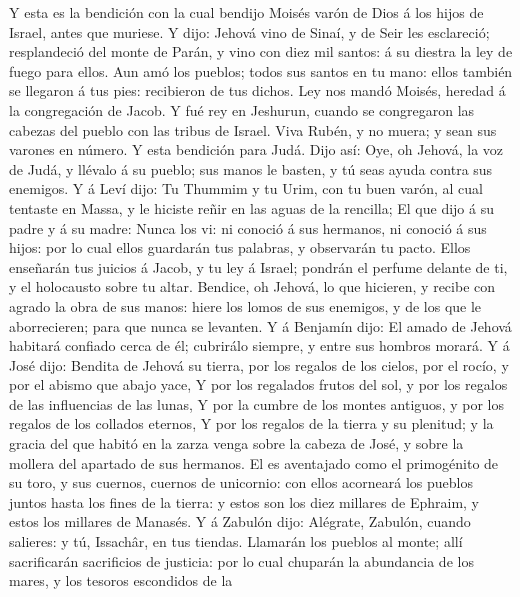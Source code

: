  Y esta es la bendición con la cual bendijo Moisés varón
de Dios á los hijos de Israel, antes que muriese.  Y dijo:
Jehová vino de Sinaí, y de Seir les esclareció; resplandeció del monte
de Parán, y vino con diez mil santos: á su diestra la ley de fuego para
ellos.  Aun amó los pueblos; todos sus santos en tu mano:
ellos también se llegaron á tus pies: recibieron de tus dichos.
 Ley nos mandó Moisés, heredad á la congregación de Jacob.
 Y fué rey en Jeshurun, cuando se congregaron las cabezas
del pueblo con las tribus de Israel.  Viva Rubén, y no
muera; y sean sus varones en número.  Y esta bendición
para Judá. Dijo así: Oye, oh Jehová, la voz de Judá, y llévalo á su
pueblo; sus manos le basten, y tú seas ayuda contra sus enemigos.
 Y á Leví dijo: Tu Thummim y tu Urim, con tu buen varón,
al cual tentaste en Massa, y le hiciste reñir en las aguas de la
rencilla;  El que dijo á su padre y á su madre: Nunca los
vi: ni conoció á sus hermanos, ni conoció á sus hijos: por lo cual ellos
guardarán tus palabras, y observarán tu pacto.  Ellos
enseñarán tus juicios á Jacob, y tu ley á Israel; pondrán el perfume
delante de ti, y el holocausto sobre tu altar.  Bendice,
oh Jehová, lo que hicieren, y recibe con agrado la obra de sus manos:
hiere los lomos de sus enemigos, y de los que le aborrecieren; para que
nunca se levanten.  Y á Benjamín dijo: El amado de Jehová
habitará confiado cerca de él; cubrirálo siempre, y entre sus hombros
morará.  Y á José dijo: Bendita de Jehová su tierra, por
los regalos de los cielos, por el rocío, y por el abismo que abajo yace,
 Y por los regalados frutos del sol, y por los regalos de
las influencias de las lunas,  Y por la cumbre de los
montes antiguos, y por los regalos de los collados eternos,
 Y por los regalos de la tierra y su plenitud; y la
gracia del que habitó en la zarza venga sobre la cabeza de José, y sobre
la mollera del apartado de sus hermanos.  El es
aventajado como el primogénito de su toro, y sus cuernos, cuernos de
unicornio: con ellos acorneará los pueblos juntos hasta los fines de la
tierra: y estos son los diez millares de Ephraim, y estos los millares
de Manasés.  Y á Zabulón dijo: Alégrate, Zabulón, cuando
salieres: y tú, Issachâr, en tus tiendas.  Llamarán los
pueblos al monte; allí sacrificarán sacrificios de justicia: por lo cual
chuparán la abundancia de los mares, y los tesoros escondidos de la
